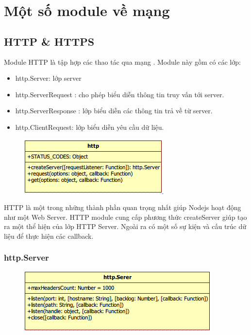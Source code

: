 \section{Một số module về mạng}
	\subsection{HTTP \& HTTPS}
	Module HTTP là tập hợp các thao tác qua mạng . Module này gồm có các lớp:
		\begin{itemize}
			\item http.Server: lớp server
			\item http.ServerRequest : cho phép biểu diễn thông tin truy vấn tới server.
			\item http.ServerResponse : lớp biểu diễn các thông tin trả về từ server.
			\item http.ClientRequest: lớp biểu diễn yêu cầu dữ liệu.
		\end{itemize}	
		
		\begin{figure}[h]
	    	\centering
			\includegraphics[scale=0.7]{3_3_1}
		\end{figure}		 
		
		HTTP là một trong những thành phần quan trọng nhất giúp Nodejs hoạt động như một Web Server. HTTP module cung cấp phương thức createServer giúp tạo ra một thể hiện của lớp HTTP Server. Ngoài ra có một số sự kiện và cấu trúc dữ liệu để thực hiện các callback.
		
	\subsubsection{http.Server}
		
		\begin{figure}[h]
			\centering
			\includegraphics[scale=0.7]{3_3_2}
		\end{figure}
		
